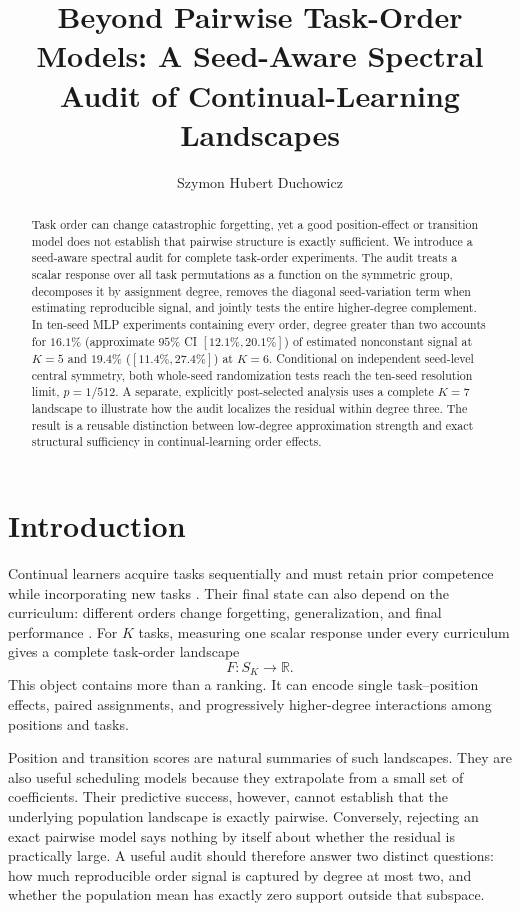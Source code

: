 \documentclass{article}
\title{Beyond Pairwise Task-Order Models: A Seed-Aware Spectral Audit of Continual-Learning Landscapes}
\author{Szymon Hubert Duchowicz}
\date{}
\newcommand{\Sgroup}{S_K}
\newcommand{\R}{\mathbb{R}}
\begin{document}
\maketitle

\begin{abstract}
Task order can change catastrophic forgetting, yet a good position-effect or transition model does not establish that pairwise structure is exactly sufficient. We introduce a seed-aware spectral audit for complete task-order experiments. The audit treats a scalar response over all task permutations as a function on the symmetric group, decomposes it by assignment degree, removes the diagonal seed-variation term when estimating reproducible signal, and jointly tests the entire higher-degree complement. In ten-seed MLP experiments containing every order, degree greater than two accounts for $16.1\%$ (approximate $95\%$ CI $[12.1\%,20.1\%]$) of estimated nonconstant signal at $K=5$ and $19.4\%$ ($[11.4\%,27.4\%]$) at $K=6$. Conditional on independent seed-level central symmetry, both whole-seed randomization tests reach the ten-seed resolution limit, $p=1/512$. A separate, explicitly post-selected analysis uses a complete $K=7$ landscape to illustrate how the audit localizes the residual within degree three. The result is a reusable distinction between low-degree approximation strength and exact structural sufficiency in continual-learning order effects.
\end{abstract}

\section{Introduction}

Continual learners acquire tasks sequentially and must retain prior competence while incorporating new tasks \citep{kirkpatrick2017overcoming,parisi2019continual}. Their final state can also depend on the curriculum: different orders change forgetting, generalization, and final performance \citep{bell2022ordering,lin2023theory}. For $K$ tasks, measuring one scalar response under every curriculum gives a complete task-order landscape
\begin{equation}
  F:\Sgroup\longrightarrow\R.
  \label{eq:landscape}
\end{equation}
This object contains more than a ranking. It can encode single task--position effects, paired assignments, and progressively higher-degree interactions among positions and tasks.

Position and transition scores are natural summaries of such landscapes. They are also useful scheduling models because they extrapolate from a small set of coefficients. Their predictive success, however, cannot establish that the underlying population landscape is exactly pairwise. Conversely, rejecting an exact pairwise model says nothing by itself about whether the residual is practically large. A useful audit should therefore answer two distinct questions: how much reproducible order signal is captured by degree at most two, and whether the population mean has exactly zero support outside that subspace.
\end{document}
